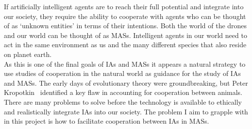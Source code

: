 \documentclass[]{final_report}
\begin{document}
If artificially intelligent agents are to reach their full potential and integrate into our society, they require the ability to cooperate with agents who can be thought of as `unknown entities' in terms of their intentions. Both the world of the drones and our world can be thought of as MASs. Intelligent agents in our world need to act in the same environment as us and the many different species that also reside on planet earth.\\
As this is one of the final goals of IAs and MASs it appears a natural strategy to use studies of cooperation in the natural world as guidance for the study of IAs and MASs. The early days of evolutionary theory were groundbreaking, but Peter Kropotkin~\cite{kropotkin1902mutual} identified a key flaw in accounting for cooperation between animals.\\
There are many problems to solve before the technology is available to ethically and realistically integrate IAs into our society. The problem I aim to grapple with in this project is how to facilitate cooperation between IAs in MASs.
\end{document}
